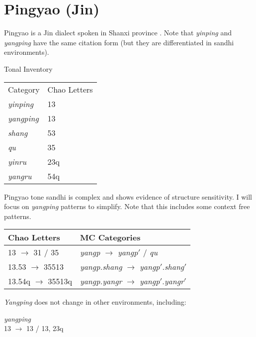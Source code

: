 \documentclass{article}
\begin{document}
\section{Pingyao (Jin)}
Pingyao is a Jin dialect spoken in Shanxi province \cite{Hou1980, chen2000}. Note that \textit{yinping} and \textit{yangping} have the same citation form (but they are differentiated in sandhi environments).
\begin{exe}
\ex Tonal Inventory \\
\begin{tabular}[t]{|ll|}
\hline
Category & Chao Letters \\
\textit{yinping} & 13 \\
\textit{yangping} & 13 \\
\textit{shang} & 53 \\
\textit{qu} & 35 \\
\textit{yinru} & 23q \\
\textit{yangru} & 54q \\
\hline
\end{tabular}
\end{exe}
Pingyao tone sandhi is complex and shows evidence of structure sensitivity. I will focus on \textit{yangping} patterns to simplify. Note that this includes some context free patterns. 
\begin{exe}
\ex
\begin{tabular}[t]{ll}
Chao Letters & MC Categories \\
\hline
13 $\rightarrow$ 31 / \underline{\hspace{1em}} 35 & \textit{yangp} $\rightarrow$ \textit{yangp}$'$ / \underline{\hspace{1em}} \textit{qu} \\ 
13.53 $\rightarrow$ 35513 & \textit{yangp.shang} $\rightarrow$ \textit{yangp}$'$.\textit{shang}$'$ \\ 
13.54q $\rightarrow$ 35513q & \textit{yangp.yangr} $\rightarrow$ \textit{yangp}$'$.\textit{yangr}$'$ \\ 
\end{tabular}
\end{exe}
\textit{Yangping} does not change in other environments, including:
\begin{exe}
\ex 
\begin{xlist}
\ex \textit{yangping} \\
13 $\rightarrow$ 13 / \underline{\hspace{1em}} 13, 23q \\
\end{xlist}
\end{exe}
\end{document}
